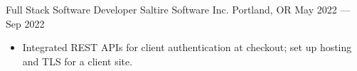 \showoff
{Full Stack Software Developer}
{Saltire Software Inc.}
{Portland, OR}
{May 2022 --- Sep 2022}

\begin{itemize}
    \item Integrated REST APIs for client authentication at checkout; set up hosting and TLS for a client site.
\end{itemize}
